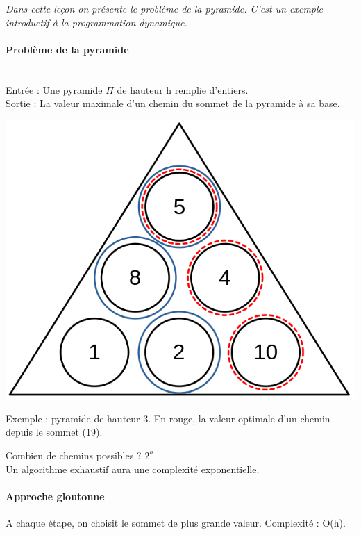 
\textit{Dans cette leçon on présente le problème de la pyramide. C'est un exemple introductif à la programmation dynamique.}

\paragraph{Problème de la pyramide} \enspace\\ Entrée : Une pyramide $\Pi$ de hauteur h remplie d'entiers.\\ Sortie : La valeur maximale d'un chemin du sommet de la pyramide à sa base.

\begin{center}
	\includegraphics[scale=0.4]{Developpements/Pyramide/pyramide.png}
\end{center}

Exemple : pyramide de hauteur 3. En rouge, la valeur optimale d'un chemin depuis le sommet (19).

\begin{rem}
	Combien de chemins possibles ? $2^{h}$ \\
	Un algorithme exhaustif aura une complexité exponentielle.
\end{rem}

\paragraph{Approche gloutonne\\} A chaque étape, on choisit le sommet de plus grande valeur. Complexité : O(h).

